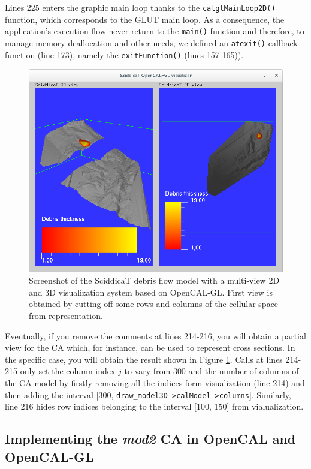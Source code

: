 Lines 225 enters the graphic main loop thanks to the
\verb'calglMainLoop2D()' function, which corresponds to the GLUT main
loop. As a consequence, the application's execution flow never return
to the \verb'main()' function and therefore, to manage memory
deallocation and other needs, we defined an \verb'atexit()' callback
function (line 173), namely the \verb'exitFunction()' (lines
157-165)).

\begin{figure}
  \begin{center}
    \includegraphics[width=12cm]{./images/OpenCAL/calgl_sciddicaT3}
    \caption{Screenshot of the SciddicaT debris flow model with a
      multi-view 2D and 3D visualization system based on
      OpenCAL-GL. First view is obtained by cutting off some rows and
      columns of the cellular space from representation.}
    \label{fig:calgl_sciddicaT3}
  \end{center}
\end{figure}

Eventually, if you remove the comments at lines 214-216, you will
obtain a partial view for the CA which, for instance, can be used to
represent cross sections. In the specific case, you will obtain the
result shown in Figure \ref{fig:calgl_sciddicaT3}. Calls at lines
214-215 only set the column index $j$ to vary from 300 and the number
of columns of the CA model by firstly removing all the indices form
visualization (line 214) and then adding the interval [300,
  \verb'draw_model3D->calModel->columns']. Similarly, line 216 hides
row indices belonging to the interval [100, 150] from vialualization.

\subsection{Implementing the \emph{mod2} CA in OpenCAL and OpenCAL-GL}


